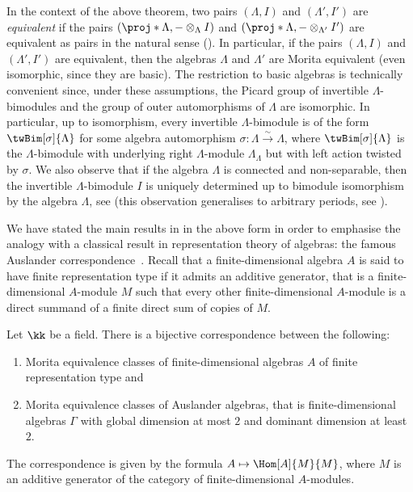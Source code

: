 \documentclass[a4paper]{amsart}
\begin{document}
In the context of the above theorem, two pairs $(\Lambda,I)$ and $(\Lambda',I')$
are \emph{equivalent} if the pairs $(\proj*{\Lambda},-\otimes_{\Lambda}I)$ and
$(\proj*{\Lambda},-\otimes_{\Lambda'}I')$ are equivalent as pairs in the natural
sense (). In particular, if the pairs $(\Lambda,I)$
and $(\Lambda',I')$ are equivalent, then the algebras $\Lambda$ and $\Lambda'$
are Morita equivalent (even isomorphic, since they are basic). The restriction
to basic algebras is technically convenient since, under these assumptions, the
Picard group of invertible $\Lambda$-bimodules and the group of outer
automorphisms of $\Lambda$ are isomorphic. In particular, up to isomorphism,
every invertible $\Lambda$-bimodule is of the form $\twBim[\sigma]{\Lambda}$ for
some algebra automorphism $\sigma\colon\Lambda\stackrel{\sim}{\to}\Lambda$,
where $\twBim[\sigma]{\Lambda}$ is the $\Lambda$-bimodule with underlying right
$\Lambda$-module $\Lambda_\Lambda$ but with left action twisted by $\sigma$. We
also observe that if the algebra $\Lambda$ is connected and non-separable, then
the invertible $\Lambda$-bimodule $I$ is uniquely determined up to bimodule
isomorphism by the algebra $\Lambda$, see \cite[Prop.~9.8]{Mur22} (this
observation generalises to arbitrary periods, see
).

We have stated the main results in \cite{Mur22} in the above form in order to
emphasise the analogy with a classical result in representation theory of
algebras: the famous Auslander correspondence~\cite{Aus71}. Recall that a
finite-dimensional algebra $A$ is said to have finite representation type if it
admits an additive generator, that is a finite-dimensional $A$-module $M$ such
that every other finite-dimensional $A$-module is a direct summand of a finite
direct sum of copies of $M$.

\begin{theorem*}
  Let $\kk$ be a field. There is a bijective correspondence between the
  following:
  \begin{enumerate}
  \item Morita equivalence classes of finite-dimensional algebras $A$ of finite
    representation type and
  \item Morita equivalence classes of Auslander algebras, that is
    finite-dimensional algebras $\Gamma$ with global dimension at most $2$ and
    dominant dimension \cite{Tac64} at least $2$.
  \end{enumerate}
  The correspondence is given by the formula $A\mapsto\Hom[A]{M}{M}$, where $M$
  is an additive generator of the category of finite-dimensional $A$-modules.
\end{theorem*}
\end{document}
